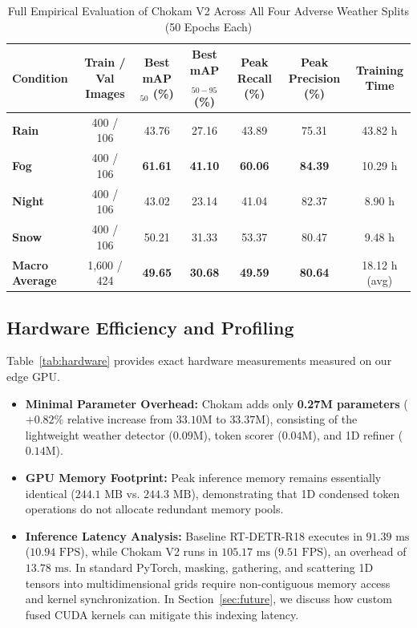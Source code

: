 \documentclass[conference]{IEEEtran}
\begin{document}
\begin{table}[t]
\centering
\caption{Full Empirical Evaluation of Chokam V2 Across All Four Adverse Weather Splits (50 Epochs Each)}
\label{tab:all_weathers}
\begin{tabular}{lcccccc}
\toprule
\textbf{Condition} & \textbf{Train / Val Images} & \textbf{Best mAP}$_{50}$ (\%) & \textbf{Best mAP}$_{50-95}$ (\%) & \textbf{Peak Recall} (\%) & \textbf{Peak Precision} (\%) & \textbf{Training Time} \\
\midrule
\textbf{Rain}   & 400 / 106 & 43.76 & 27.16 & 43.89 & 75.31 & 43.82 h \\
\textbf{Fog}    & 400 / 106 & \textbf{61.61} & \textbf{41.10} & \textbf{60.06} & \textbf{84.39} & 10.29 h \\
\textbf{Night}  & 400 / 106 & 43.02 & 23.14 & 41.04 & 82.37 & 8.90 h \\
\textbf{Snow}   & 400 / 106 & 50.21 & 31.33 & 53.37 & 80.47 & 9.48 h \\
\midrule
\textbf{Macro Average} & 1,600 / 424 & \textbf{49.65} & \textbf{30.68} & \textbf{49.59} & \textbf{80.64} & 18.12 h (avg) \\
\bottomrule
\end{tabular}
\end{table}

\subsection{Hardware Efficiency and Profiling}
Table~\ref{tab:hardware} provides exact hardware measurements measured on our edge GPU.
\begin{itemize}
    \item \textbf{Minimal Parameter Overhead:} Chokam adds only \textbf{0.27M parameters} ($+0.82\%$ relative increase from $33.10\text{M}$ to $33.37\text{M}$), consisting of the lightweight weather detector ($0.09\text{M}$), token scorer ($0.04\text{M}$), and 1D refiner ($0.14\text{M}$).
    \item \textbf{GPU Memory Footprint:} Peak inference memory remains essentially identical ($244.1\text{ MB}$ vs. $244.3\text{ MB}$), demonstrating that 1D condensed token operations do not allocate redundant memory pools.
    \item \textbf{Inference Latency Analysis:} Baseline RT-DETR-R18 executes in $91.39\text{ ms}$ ($10.94\text{ FPS}$), while Chokam V2 runs in $105.17\text{ ms}$ ($9.51\text{ FPS}$), an overhead of $13.78\text{ ms}$. In standard PyTorch, masking, gathering, and scattering 1D tensors into multidimensional grids require non-contiguous memory access and kernel synchronization. In Section~\ref{sec:future}, we discuss how custom fused CUDA kernels can mitigate this indexing latency.
\end{itemize}
\end{document}
